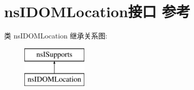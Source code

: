 \hypertarget{interfacens_i_d_o_m_location}{}\section{ns\+I\+D\+O\+M\+Location接口 参考}
\label{interfacens_i_d_o_m_location}
类 ns\+I\+D\+O\+M\+Location 继承关系图\+:\begin{figure}[H]
\begin{center}
\leavevmode
\includegraphics[height=2.000000cm]{interfacens_i_d_o_m_location}
\end{center}
\end{figure}
